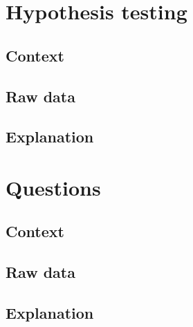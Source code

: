 \section{Hypothesis testing}

\subsection{Context}
\subsection{Raw data}
\subsection{Explanation}

\section{Questions}

\subsection{Context}
\subsection{Raw data}
\subsection{Explanation}